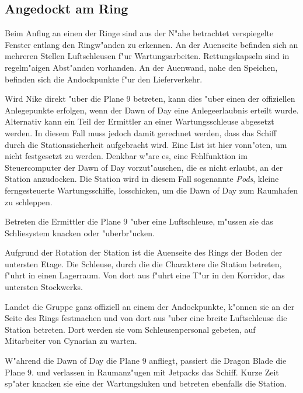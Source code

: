 \subsection{Angedockt am Ring}
Beim Anflug an einen der Ringe sind aus der N"ahe betrachtet verspiegelte Fenster entlang den Ringw"anden zu erkennen. An der Au\3enseite befinden sich an mehreren Stellen Luftschleusen f"ur Wartungsarbeiten. Rettungskapseln sind in regelm"a\3igen Abst"anden vorhanden. An der Au\3enwand, nahe den Speichen, befinden sich die Andockpunkte f"ur den Lieferverkehr.

Wird Nike direkt "uber die Plane 9 betreten, kann dies "uber einen der offiziellen Anlegepunkte erfolgen, wenn der Dawn of Day eine Anlegeerlaubnis erteilt wurde. Alternativ kann ein Teil der Ermittler an einer Wartungsschleuse abgesetzt werden. In diesem Fall muss jedoch damit gerechnet werden, dass das Schiff durch die Stationssicherheit aufgebracht wird. Eine List ist hier vonn"oten, um nicht festgesetzt zu werden. Denkbar w"are es, eine Fehlfunktion im Steuercomputer der Dawn of Day vorzut"auschen, die es nicht erlaubt, an der Station anzudocken. Die Station wird in diesem Fall sogenannte \emph{Pods}, kleine ferngesteuerte Wartungsschiffe, losschicken, um die Dawn of Day zum Raumhafen zu schleppen.

Betreten die Ermittler die Plane 9 "uber eine Luftschleuse, m"ussen sie das Schlie\3system knacken oder "uberbr"ucken.

Aufgrund der Rotation der Station ist die Au\3enseite des Rings der Boden der untersten Etage. Die Schleuse, durch die die Charaktere die Station betreten, f"uhrt in einen Lagerraum. Von dort aus f"uhrt eine T"ur in den Korridor, das untersten Stockwerks.

Landet die Gruppe ganz offiziell an einem der Andockpunkte, k"onnen sie an der Seite des Rings festmachen und von dort aus "uber eine breite Luftschleuse die Station betreten. Dort werden sie vom Schleusenpersonal gebeten, auf Mitarbeiter von Cynarian zu warten.

W"ahrend die Dawn of Day die Plane 9 anfliegt, passiert die Dragon Blade die Plane 9. \xl{} und \ml{} verlassen in Raumanz"ugen mit Jetpacks das Schiff. Kurze Zeit sp"ater knacken sie eine der Wartungsluken und betreten ebenfalls die Station.


